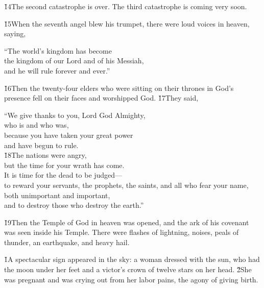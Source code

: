 \v{14}The second catastrophe is over. The third catastrophe is coming very soon.

\v{15}When the seventh angel blew his trumpet, there were loud voices in heaven, saying,

\begin{poetry}
\poeml ``The world's kingdom has become \\
\poemll    the kingdom of our Lord and of his Messiah, \\
\poemlll       and he will rule forever and ever.''
\end{poetry}

\v{16}Then the twenty-four elders who were sitting on their thrones in God's presence fell on their faces and worshipped God. \v{17}They said,

\begin{poetry}
\poeml ``We give thanks to you, Lord God Almighty, \\
\poemll    who is and who was, \\
\poeml because you have taken your great power \\
\poemll    and have begun to rule. \\
\poeml \v{18}The nations were angry, \\
\poemll    but the time for your wrath has come. \\
\poeml It is time for the dead to be judged--- \\
\poemll    to reward your servants, the prophets, the saints, and all who fear your name, \\
\poemlll       both unimportant and important, \\
\poemll    and to destroy those who destroy the earth.''
\end{poetry}

\v{19}Then the Temple of God in heaven was opened, and the ark of his covenant was seen inside his Temple. There were flashes of lightning, noises, peals of thunder, an earthquake, and heavy hail.

\v{1}A spectacular sign appeared in the sky: a woman dressed with the sun, who had the moon under her feet and a victor's crown of twelve stars on her head. \v{2}She was pregnant and was crying out from her labor pains, the agony of giving birth.

